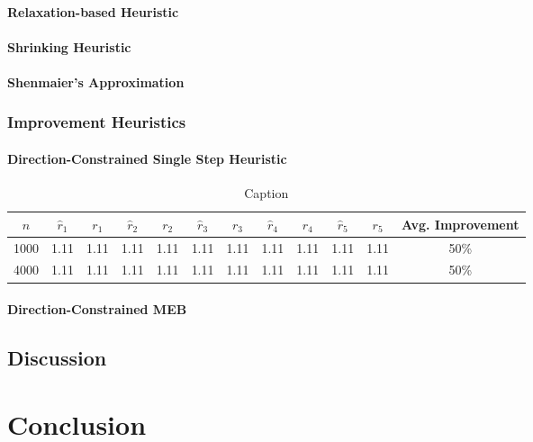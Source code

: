 \documentclass[11pt,twoside]{report}
\theoremstyle{definition}
\numberwithin{theorem}{section}
\numberwithin{definition}{section}
\numberwithin{lemma}{section}
\numberwithin{proposition}{section}
\numberwithin{equation}{section}
\numberwithin{figure}{section}
\begin{document}
\subsubsection{Relaxation-based Heuristic}
\subsubsection{Shrinking Heuristic}
\subsubsection{Shenmaier's Approximation}

\subsection{Improvement Heuristics}
\subsubsection{Direction-Constrained Single Step Heuristic}

\begin{table}
    \centering
    \begin{tabular}{|c|cc|cc|cc|cc|cc|c|} \hline
        $n$ & $\hat{r}_1$ & $r_1$ & $\hat{r}_2$ & $r_2$ & $\hat{r}_3$ & $r_3$ & $\hat{r}_4$ & $r_4$ & $\hat{r}_5$ & $r_5$ & Avg. Improvement \\ \hline 
        1000 & 1.11 & 1.11 & 1.11 & 1.11 & 1.11 & 1.11 & 1.11 & 1.11 & 1.11 & 1.11 & 50\% \\
        4000 & 1.11 & 1.11 & 1.11 & 1.11 & 1.11 & 1.11 & 1.11 & 1.11 & 1.11 & 1.11 & 50\%
        \\ \hline
    \end{tabular}
    \caption{Caption}
    \label{tab:my_label}
\end{table}
\subsubsection{Direction-Constrained MEB}

\section{Discussion}

\chapter{Conclusion}
\end{document}
